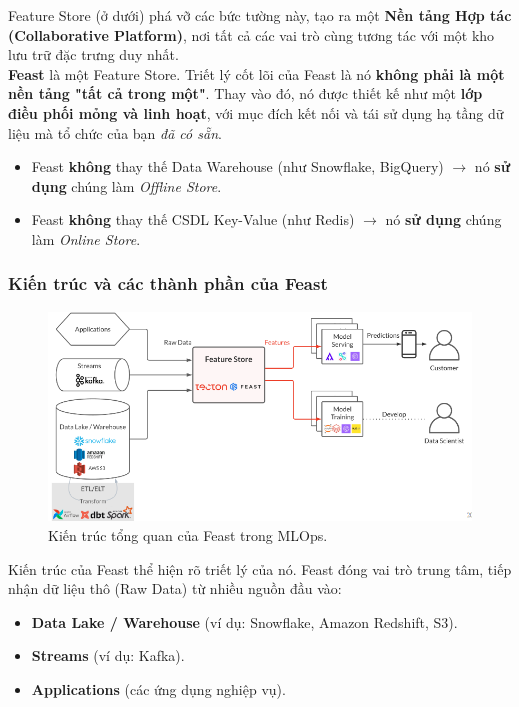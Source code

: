 \documentclass[11pt]{article}
\begin{document}
Feature Store (ở dưới) phá vỡ các bức tường này, tạo ra một \textbf{Nền tảng Hợp tác (Collaborative Platform)}, nơi tất cả các vai trò cùng tương tác với một kho lưu trữ đặc trưng duy nhất. \\

\textbf{Feast} là một Feature Store. Triết lý cốt lõi của Feast là nó \textbf{không phải là một nền tảng "tất cả trong một"}. Thay vào đó, nó được thiết kế như một \textbf{lớp điều phối mỏng và linh hoạt}, với mục đích kết nối và tái sử dụng hạ tầng dữ liệu mà tổ chức của bạn \textit{đã có sẵn}.
\begin{itemize}
    \item Feast \textbf{không} thay thế Data Warehouse (như Snowflake, BigQuery) $\rightarrow$ nó \textbf{sử dụng} chúng làm \textit{Offline Store}.
    \item Feast \textbf{không} thay thế CSDL Key-Value (như Redis) $\rightarrow$ nó \textbf{sử dụng} chúng làm \textit{Online Store}.
\end{itemize}

\subsubsection{Kiến trúc và các thành phần của Feast}

\begin{figure}[H]
    \centering
    \includegraphics[width=\linewidth]{images/feast_pipeline.png}
    \caption{Kiến trúc tổng quan của Feast trong MLOps.}
\end{figure}

Kiến trúc của Feast thể hiện rõ triết lý của nó. Feast đóng vai trò trung tâm, tiếp nhận dữ liệu thô (Raw Data) từ nhiều nguồn đầu vào:
\begin{itemize}
    \item \textbf{Data Lake / Warehouse} (ví dụ: Snowflake, Amazon Redshift, S3).
    \item \textbf{Streams} (ví dụ: Kafka).
    \item \textbf{Applications} (các ứng dụng nghiệp vụ).
\end{itemize}
\end{document}
